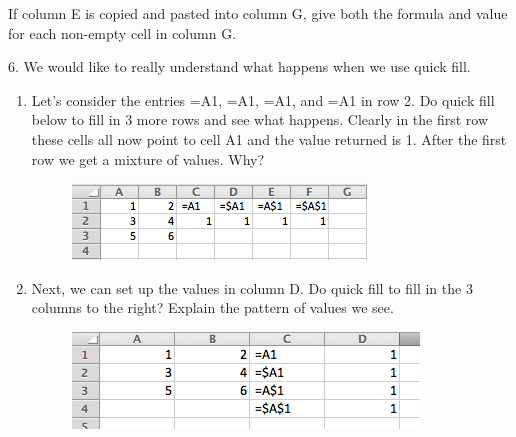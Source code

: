 \documentclass[10pt,]{book}
\theoremstyle{plain}
\theoremstyle{definition}
\theoremstyle{definition}
\begin{document}
\begin{exerciselist}
 
	If column E is copied and pasted into column G, give both the formula and value for each non-empty cell in column G.
%
\par\smallskip
\item[6.]\hypertarget{exercise-47}{}  We would like to really understand what happens when we use quick fill. %
\leavevmode%
\begin{enumerate}[label=(\Alph*)]
\item\hypertarget{li-66}{}
 Let's consider the entries =A1, =\textdollar{}A1, =A\textdollar{}1, and =\textdollar{}A\textdollar{}1 in row 2.  Do quick fill below to fill in 3 more rows and see what happens. Clearly in the first row these cells all now point to cell A1 and the value returned is 1. After the first row we get a mixture of values. Why?%
\leavevmode%
\begin{figure}
\centering
\includegraphics[width=0.8\linewidth]{images/sec1-3-e3.png}
\end{figure}
\item\hypertarget{li-67}{}
 Next, we can set up the values in column D. Do quick fill to fill in the 3 columns to the right? Explain the pattern of values we see.
 \leavevmode%
\begin{figure}
\centering
\includegraphics[width=0.8\linewidth]{images/sec1-3-e4.png}
\end{figure}
 

\end{enumerate}
\end{exerciselist}
\end{document}
